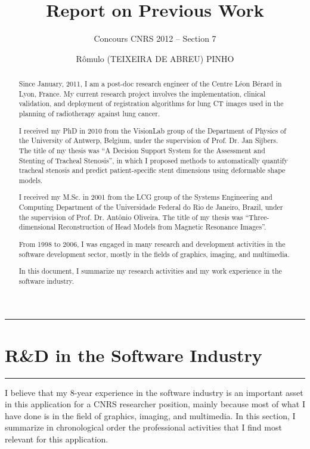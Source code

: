 \documentclass[a4paper]{article}
\title{Report on Previous Work}
\author{Concours CNRS 2012 -- Section 7}
\date{R\^omulo (TEIXEIRA DE ABREU) PINHO}
\begin{document}
\maketitle

\begin{abstract}
Since January, 2011, I am a post-doc research engineer of the Centre L\'eon B\'erard in Lyon, France. My current research project involves the implementation, clinical validation, and deployment of registration algorithms for lung CT images used in the planning of radiotherapy against lung cancer.

I received my PhD in 2010 from the VisionLab group of the Department of Physics of the University of Antwerp, Belgium, under the supervision of Prof. Dr. Jan Sijbers. The title of my thesis was ``A Decision Support System for the Assessment and Stenting of Tracheal Stenosis'', in which I proposed methods to automatically quantify tracheal stenosis and predict patient-specific stent dimensions using deformable shape models.

I received my M.Sc. in 2001 from the LCG group of the Systems Engineering and Computing Department of the Universidade Federal do Rio de Janeiro, Brazil, under the supervision of Prof. Dr. Ant\^onio Oliveira. The title of my thesis was ``Three-dimensional Reconstruction of Head Models from Magnetic Resonance Images''.

From 1998 to 2006, I was engaged in many research and development activities in the software development sector, mostly in the fields of graphics, imaging, and multimedia. 

In this document, I summarize my research activities and my work experience in the software industry.
\end{abstract}

\tableofcontents

\pagebreak


\hrule
\section{R{\&}D in the Software Industry}
\hrule

\medskip
\medskip

I believe that my 8-year experience in the software industry is an important asset in this application for a CNRS researcher position, mainly because most of what I have done is in the field of graphics, imaging, and multimedia. In this section, I summarize in chronological order the professional activities that I find most relevant for this application. 
\end{document}
